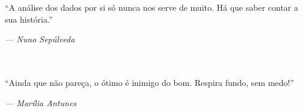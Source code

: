 \clearpage

\narrowlinespacing

\vspace*{4mm}


\noindent
``A análise dos dados por si só nunca nos serve de muito. Há que saber contar a sua história.''

\emph{--- Nuno Sepúlveda}

\noindent
\\
\\

``Ainda que não pareça, o ótimo é inimigo do bom. Respira fundo, sem medo!''

\emph{--- Marília Antunes}

\normallinespacing
